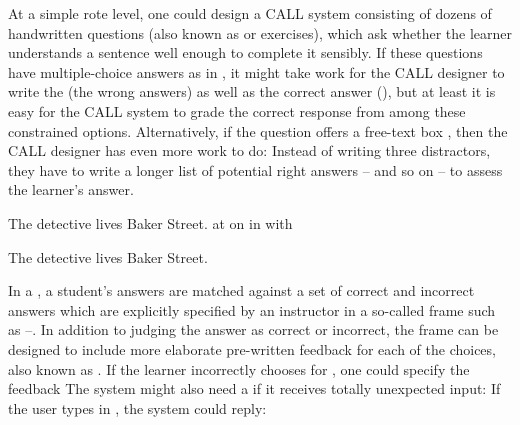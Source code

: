 At a simple rote level, one could design a CALL system consisting of dozens of handwritten  questions (also known as  or  exercises), which ask whether the learner understands a sentence well enough to complete it sensibly.  If these questions have multiple-choice answers as in , it might take work for the CALL designer to write the  (the wrong answers) as well as the correct answer (), but at least it is easy for the CALL system to grade the correct response from among these constrained options.  Alternatively, if the question offers a free-text box , then the CALL designer has even more work to do: Instead of writing three distractors, they have to write a longer list of potential right answers --  and so on -- to assess the learner's answer.

\ea \label{multichoice} The detective lives \uline{\hspace{2cm}} Baker Street.
    \ea at
    \ex on
    \ex in
    \ex with
    \z 

\ex \label{freetext} The detective lives \uline{\hspace{2cm}} Baker Street.
\z 

In a , a student's answers are matched against a set of correct and incorrect answers which are explicitly specified by an instructor in a so-called frame such as --.  In addition to judging the answer as correct or incorrect, the frame can be designed to include more elaborate pre-written feedback for each of the choices, also known as .  If the learner incorrectly chooses  for , one could specify the feedback   The system might also need a  if it receives totally unexpected input: If the user types  in , the system could reply: 

